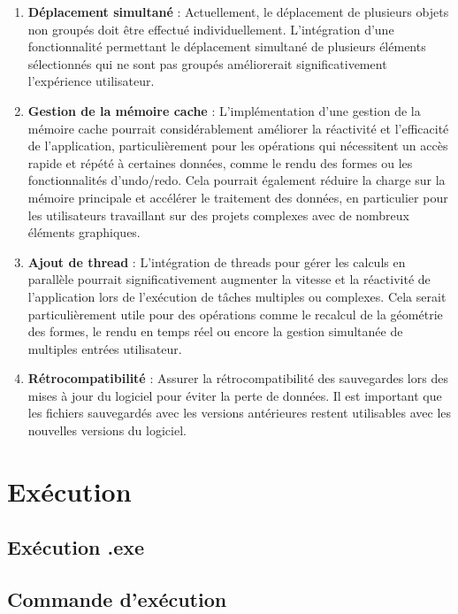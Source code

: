 \documentclass[a4paper,11pt]{article}
\begin{document}
\begin{enumerate}
    \item \textbf{Déplacement simultané} : 
    Actuellement, le déplacement de plusieurs objets non groupés doit être effectué individuellement. L'intégration d'une fonctionnalité permettant le déplacement simultané de plusieurs éléments sélectionnés qui ne sont pas groupés améliorerait significativement l'expérience utilisateur.

    \item \textbf{Gestion de la mémoire cache} :
    L'implémentation d'une gestion de la mémoire cache pourrait considérablement améliorer la réactivité et l'efficacité de l'application, particulièrement pour les opérations qui nécessitent un accès rapide et répété à certaines données, comme le rendu des formes ou les fonctionnalités d'undo/redo. Cela pourrait également réduire la charge sur la mémoire principale et accélérer le traitement des données, en particulier pour les utilisateurs travaillant sur des projets complexes avec de nombreux éléments graphiques.

    \item \textbf{Ajout de thread} :
    L'intégration de threads pour gérer les calculs en parallèle pourrait significativement augmenter la vitesse et la réactivité de l'application lors de l'exécution de tâches multiples ou complexes. Cela serait particulièrement utile pour des opérations comme le recalcul de la géométrie des formes, le rendu en temps réel ou encore la gestion simultanée de multiples entrées utilisateur.

    \item \textbf{Rétrocompatibilité} : 
    Assurer la rétrocompatibilité des sauvegardes lors des mises à jour du logiciel pour éviter la perte de données. Il est important que les fichiers sauvegardés avec les versions antérieures restent utilisables avec les nouvelles versions du logiciel.
    
\end{enumerate}
\pagebreak
\section{Exécution}

\subsection{Exécution .exe}

\subsection{Commande d'exécution}
\end{document}

